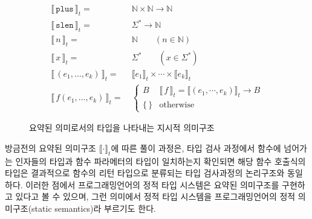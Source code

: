 \begin{figure}
\begin{align*}
\llbracket\,\texttt{plus}\,\rrbracket_t =~& \mathbb{N}\times\mathbb{N} \to \mathbb{N} \\
\llbracket\,\texttt{slen}\,\rrbracket_t =~& \Sigma^{*} \to \mathbb{N} \\
\llbracket\,n\,\rrbracket_t =~& \mathbb{N} \qquad (n\in\mathbb{N}) \\
\llbracket\,x\,\rrbracket_t =~& \Sigma^{*} \qquad (x\in\Sigma^{*}) \\
\llbracket\,(e_1,\ldots,e_k)\,\rrbracket_t =~& 
    \llbracket e_1\rrbracket_t\times\cdots\times\llbracket e_k\rrbracket_t \\
\llbracket\,f(e_1,\ldots,e_k)\,\rrbracket_t =~& \!\!\!\!
    \begin{cases}
     B & \llbracket\,f\,\rrbracket_t = \llbracket(e_1,\cdots,e_k)\rrbracket_t \to B\\
     \{\,\} & \text{otherwise}
    \end{cases}
\end{align*}
\caption{요약된 의미로서의 타입을 나타내는 지시적 의미구조\label{fig:AbsSemType}}
\end{figure}



방금전의 요약된 의미구조 $\llbracket\cdot\rrbracket_t$에 따른 풀이 과정은,
타입 검사 과정에서 함수에 넘어가는 인자들의 타입과 함수 파라메터의 타입이
일치하는지 확인되면 해당 함수 호출식의 타입은 결과적으로 함수의 리턴 타입으로
분류되는 타입 검사과정의 논리구조와 동일하다. 이러한 점에서 프로그래밍언어의
정적 타입 시스템은 요약된 의미구조를 구현하고 있다고 볼 수 있으며, 그런
의미에서 정적 타입 시스템을 프로그래밍언어의 정적 의미구조(static semantics)라
부르기도 한다.

\newpage

